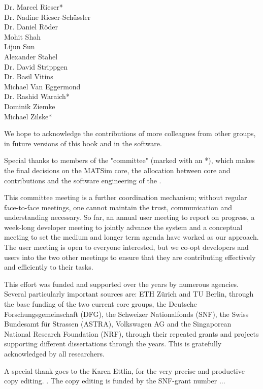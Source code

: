 \begin{multicols}{3}
Dr. Marcel Rieser\mbox{*} \\
Dr. Nadine Rieser-Schüssler \\
Dr. Daniel Röder \\
Mohit Shah \\
Lijun Sun \\
Alexander Stahel \\
Dr. David Strippgen \\
Dr. Basil Vitins \\
Michael Van Eggermond \\
Dr. Rashid Waraich\mbox{*} \\
Dominik Ziemke \\
Michael Zilske\mbox{*} \\
\end{multicols}
% 
We hope to acknowledge the contributions of more colleagues from other groups, in future versions of this book and in the software.   

Special thanks to members of the "committee" (marked with an \mbox{*}), which makes the final decisions on the MATSim core, the allocation between core and contributions and the software engineering of the .

This committee meeting is a further coordination mechanism; without regular face-to-face meetings, one cannot maintain the trust, communication and understanding necessary. So far, an annual user meeting to report on progress, a week-long developer meeting to jointly advance the system and a conceptual meeting to set the medium and longer term agenda have worked as our approach. The user meeting is open to everyone interested, but we co-opt developers and users into the two other meetings to ensure that they are contributing effectively and efficiently to their tasks. 

This effort was funded and supported over the years by numerous agencies. Several particularly important sources are: ETH Zürich and TU Berlin, through the base funding of the two current core groups, the Deutsche Forschungsgemeinschaft (DFG), the Schweizer Nationalfonds (SNF), the Swiss Bundesamt für Strassen (ASTRA), Volkswagen AG and the Singaporean National Research Foundation (NRF), through their repeated grants and projects supporting different dissertations through the years. This is gratefully acknowledged by all researchers. 

A special thank goes to the Karen Ettlin, for the very precise and productive copy editing. . The copy editing is funded by the SNF-grant number ... 

